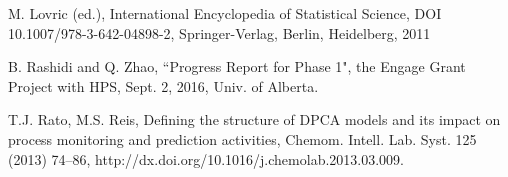 \documentclass[letterpaper, 12 pt, Journal, onecolumn]{ieeeconf}  %
\begin{document}
\begin{thebibliography}{9}
	
 M. Lovric (ed.), International Encyclopedia of Statistical Science, DOI 10.1007/978-3-642-04898-2, Springer-Verlag, Berlin, Heidelberg, 2011

 B. Rashidi and Q. Zhao, ``Progress Report for Phase 1", the Engage Grant Project with HPS, Sept. 2, 2016, Univ. of Alberta.

 T.J. Rato, M.S. Reis, Defining the structure of DPCA models and its impact on
process monitoring and prediction activities, Chemom. Intell. Lab. Syst. 125 (2013)
74–86, http://dx.doi.org/10.1016/j.chemolab.2013.03.009.
\end{thebibliography}
\end{document}
